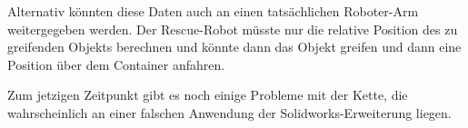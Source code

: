 Alternativ könnten diese Daten auch an einen tatsächlichen Roboter-Arm weitergegeben werden.
Der Rescue-Robot müsste nur die relative Position des zu greifenden Objekts berechnen
und könnte dann das Objekt greifen und dann eine Position über dem Container anfahren.

Zum jetzigen Zeitpunkt gibt es noch einige Probleme mit der Kette,
die wahrscheinlich an einer falschen Anwendung der Solidworks-Erweiterung liegen.
